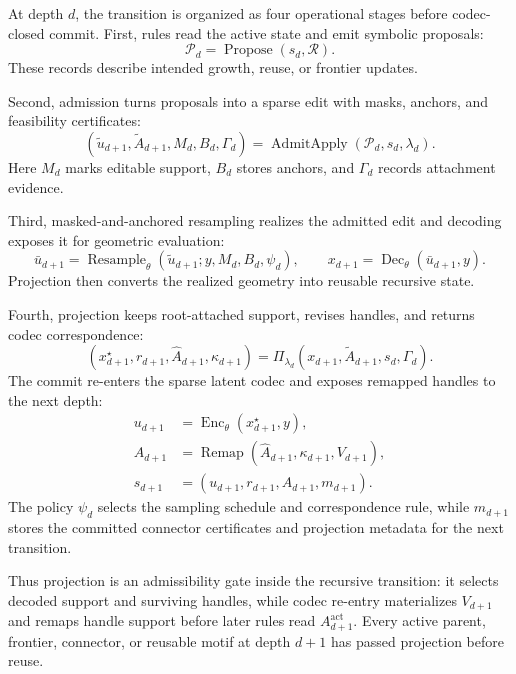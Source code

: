 \documentclass[acmtog,anonymous,review]{acmart}
\begin{document}
At depth $d$, the transition is organized as four operational stages before codec-closed commit. First, rules read the active state and emit symbolic proposals:
\begin{equation}
\mathcal P_d=\operatorname{Propose}(s_d,\mathcal R).
\end{equation}
These records describe intended growth, reuse, or frontier updates.

Second, admission turns proposals into a sparse edit with masks, anchors, and feasibility certificates:
\begin{equation}
(\widetilde u_{d+1},\widetilde A_{d+1},M_d,B_d,\Gamma_d)
=
\operatorname{AdmitApply}(\mathcal P_d,s_d,\lambda_d).
\end{equation}
Here $M_d$ marks editable support, $B_d$ stores anchors, and $\Gamma_d$ records attachment evidence.

Third, masked-and-anchored resampling realizes the admitted edit and decoding exposes it for geometric evaluation:
\begin{equation}
\bar u_{d+1}
=
\operatorname{Resample}_\theta
(\widetilde u_{d+1};y,M_d,B_d,\psi_d),
\qquad
x_{d+1}
=
\operatorname{Dec}_{\theta}(\bar u_{d+1},y).
\end{equation}
Projection then converts the realized geometry into reusable recursive state.

Fourth, projection keeps root-attached support, revises handles, and returns codec correspondence:
\begin{equation}
(x^\star_{d+1},r_{d+1},\widehat A_{d+1},\kappa_{d+1})
=
\Pi_{\lambda_d}(x_{d+1},\widetilde A_{d+1},s_d,\Gamma_d).
\end{equation}
The commit re-enters the sparse latent codec and exposes remapped handles to the next depth:
\begin{equation}
\begin{aligned}
u_{d+1}
&=
\operatorname{Enc}_{\theta}(x^\star_{d+1},y),\\
A_{d+1}
&=
\operatorname{Remap}
(\widehat A_{d+1},\kappa_{d+1},V_{d+1}),\\
s_{d+1}
&=
(u_{d+1},r_{d+1},A_{d+1},m_{d+1}).
\end{aligned}
\end{equation}
The policy $\psi_d$ selects the sampling schedule and correspondence rule, while $m_{d+1}$ stores the committed connector certificates and projection metadata for the next transition.

Thus projection is an admissibility gate inside the recursive transition: it selects decoded support and surviving handles, while codec re-entry materializes $V_{d+1}$ and remaps handle support before later rules read $A_{d+1}^{\mathrm{act}}$. Every active parent, frontier, connector, or reusable motif at depth $d+1$ has passed projection before reuse.
\end{document}
